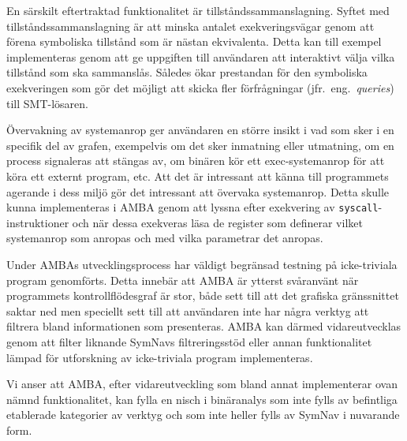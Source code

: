 En särskilt eftertraktad funktionalitet är tillståndssammanslagning. Syftet med
tillståndssammanslagning är att minska antalet exekveringsvägar genom att förena
symboliska tillstånd som är nästan ekvivalenta. Detta kan till exempel
implementeras genom att ge uppgiften till användaren att interaktivt välja vilka
tillstånd som ska sammanslås. Således ökar prestandan för den symboliska
exekveringen som gör det möjligt att skicka fler förfrågningar (jfr.\ eng.\
\emph{queries}) till SMT-lösaren.

Övervakning av systemanrop ger användaren en
större insikt i vad som sker i en specifik del av grafen, exempelvis om det sker
inmatning eller utmatning, om en process signaleras att stängas av, om binären
kör ett exec-systemanrop för att köra ett externt program, etc. Att det är
intressant att känna till programmets agerande i dess miljö gör det intressant
att övervaka systemanrop. Detta skulle kunna implementeras i AMBA genom att
lyssna efter exekvering av \texttt{syscall}-instruktioner och när dessa
exekveras läsa de register som definerar vilket systemanrop som anropas och med
vilka parametrar det anropas.

Under AMBAs utvecklingsprocess har väldigt begränsad testning på icke-triviala
program genomförts. Detta innebär att AMBA är ytterst svåranvänt när programmets
kontrollflödesgraf är stor, både sett till att det grafiska gränssnittet saktar
ned men speciellt sett till att användaren inte har några verktyg att filtrera
bland informationen som presenteras. AMBA kan därmed vidareutvecklas genom att
filter liknande SymNavs filtreringsstöd eller annan funktionalitet lämpad för
utforskning av icke-triviala program implementeras.

Vi anser att AMBA, efter vidareutveckling som bland annat implementerar ovan
nämnd funktionalitet, kan fylla en nisch i binäranalys som inte fylls av
befintliga etablerade kategorier av verktyg och som inte heller fylls av SymNav
i nuvarande form.
